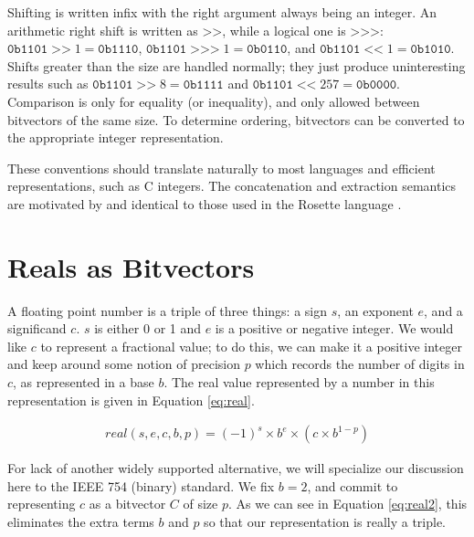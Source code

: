 \documentclass[letterpaper,10pt]{article}
\begin{document}
Shifting is written infix with the right argument always being an integer. An arithmetic right shift is written as $\texttt{>>}$, while a logical one is $\texttt{>>>}$: $\texttt{0b1101} \;\texttt{>>}\; 1 = \texttt{0b1110}$, $\texttt{0b1101} \;\texttt{>>>}\; 1 = \texttt{0b0110}$, and $\texttt{0b1101} \;\texttt{<<}\; 1 = \texttt{0b1010}$. Shifts greater than the size are handled normally; they just produce uninteresting results such as $\texttt{0b1101} \;\texttt{>>}\; 8 = \texttt{0b1111}$ and $\texttt{0b1101} \;\texttt{<<}\; 257 = \texttt{0b0000}$. Comparison is only for equality (or inequality), and only allowed between bitvectors of the same size. To determine ordering, bitvectors can be converted to the appropriate integer representation.

These conventions should translate naturally to most languages and efficient representations, such as C integers. The concatenation and extraction semantics are motivated by and identical to those used in the Rosette language \cite{rosette}.

\section{Reals as Bitvectors}

A floating point number is a triple of three things: a sign $s$, an exponent $e$, and a significand $c$. $s$ is either 0 or 1 and $e$ is a positive or negative integer. We would like $c$ to represent a fractional value; to do this, we can make it a positive integer and keep around some notion of precision $p$ which records the number of digits in $c$, as represented in a base $b$. The real value represented by a number in this representation is given in Equation \ref{eq:real}.

\begin{align} \label{eq:real}
 real(s, e, c, b, p) = (-1)^s \times b^e \times (c \times b^{1 - p})
\end{align}


For lack of another widely supported alternative, we will specialize our discussion here to the IEEE 754 (binary) standard. We fix $b = 2$, and commit to representing $c$ as a bitvector $C$ of size $p$. As we can see in Equation \ref{eq:real2}, this eliminates the extra terms $b$ and $p$ so that our representation is really a triple.
\end{document}

